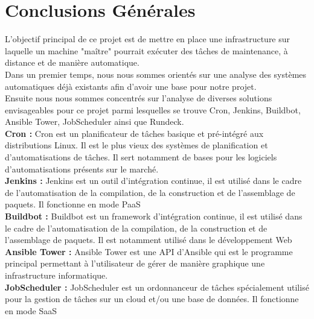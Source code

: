 \documentclass[12pt]{article}
\begin{document}

\section{Conclusions Générales}
L'objectif principal de ce projet est de mettre en place une infrastructure sur laquelle un machine "maître" pourrait exécuter des tâches de maintenance, à distance et de manière automatique.
\\
Dans un premier temps, nous nous sommes orientés sur une analyse des systèmes automatiques déjà existants afin d'avoir une base pour notre projet.
\\
Ensuite nous nous sommes concentrés sur l'analyse de diverses solutions envisageables pour ce projet parmi lesquelles se trouve Cron, Jenkins, Buildbot, Ansible Tower, JobScheduler ainsi que Rundeck.
\vspace{1cm}
\\
\textbf{Cron :} Cron est un planificateur de tâches basique et pré-intégré aux distributions Linux. Il est le plus vieux des systèmes de planification et d'automatisations de tâches. Il sert notamment de bases pour les logiciels d'automatisations présents sur le marché.
\vspace{0.5cm}
\\
\textbf{Jenkins :} Jenkins est un outil d'intégration continue, il est utilisé dans le cadre de l'automatisation de la compilation, de la construction et de l'assemblage de paquets. Il fonctionne en mode PaaS
\vspace{0.5cm}
\\
\textbf{Buildbot :} Buildbot est un framework d'intégration continue, il est utilisé dans le cadre de l'automatisation de la compilation, de la construction et de l'assemblage de paquets. Il est notamment utilisé dans le développement Web
\vspace{0.5cm}
\\
\textbf{Ansible Tower :} Ansible Tower est une API d'Ansible qui est le programme principal permettant à l'utilisateur de gérer de manière graphique une infrastructure informatique.
\vspace{0.5cm}
\\
\textbf{JobScheduler :} JobScheduler est un ordonnanceur de tâches spécialement utilisé pour la gestion de tâches sur un cloud et/ou une base de données. Il fonctionne en mode SaaS
\vspace{0.5cm}
\end{document}
